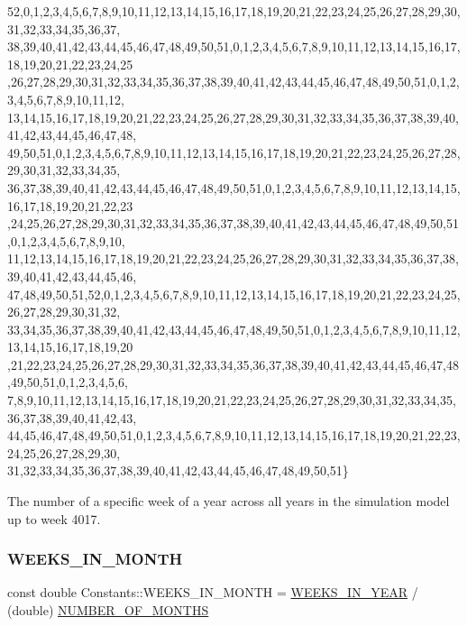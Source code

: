 \begin{DoxyCode}
      52,0,1,2,3,4,5,6,7,8,9,10,11,12,13,14,15,16,17,18,19,20,21,22,23,24,25,26,27,28,29,30,31,32,33,34,35,36,37,
      38,39,40,41,42,43,44,45,46,47,48,49,50,51,0,1,2,3,4,5,6,7,8,9,10,11,12,13,14,15,16,17,18,19,20,21,22,23,24,25
      ,26,27,28,29,30,31,32,33,34,35,36,37,38,39,40,41,42,43,44,45,46,47,48,49,50,51,0,1,2,3,4,5,6,7,8,9,10,11,12,
      13,14,15,16,17,18,19,20,21,22,23,24,25,26,27,28,29,30,31,32,33,34,35,36,37,38,39,40,41,42,43,44,45,46,47,48,
      49,50,51,0,1,2,3,4,5,6,7,8,9,10,11,12,13,14,15,16,17,18,19,20,21,22,23,24,25,26,27,28,29,30,31,32,33,34,35,
      36,37,38,39,40,41,42,43,44,45,46,47,48,49,50,51,0,1,2,3,4,5,6,7,8,9,10,11,12,13,14,15,16,17,18,19,20,21,22,23
      ,24,25,26,27,28,29,30,31,32,33,34,35,36,37,38,39,40,41,42,43,44,45,46,47,48,49,50,51,0,1,2,3,4,5,6,7,8,9,10,
      11,12,13,14,15,16,17,18,19,20,21,22,23,24,25,26,27,28,29,30,31,32,33,34,35,36,37,38,39,40,41,42,43,44,45,46,
      47,48,49,50,51,52,0,1,2,3,4,5,6,7,8,9,10,11,12,13,14,15,16,17,18,19,20,21,22,23,24,25,26,27,28,29,30,31,32,
      33,34,35,36,37,38,39,40,41,42,43,44,45,46,47,48,49,50,51,0,1,2,3,4,5,6,7,8,9,10,11,12,13,14,15,16,17,18,19,20
      ,21,22,23,24,25,26,27,28,29,30,31,32,33,34,35,36,37,38,39,40,41,42,43,44,45,46,47,48,49,50,51,0,1,2,3,4,5,6,
      7,8,9,10,11,12,13,14,15,16,17,18,19,20,21,22,23,24,25,26,27,28,29,30,31,32,33,34,35,36,37,38,39,40,41,42,43,
      44,45,46,47,48,49,50,51,0,1,2,3,4,5,6,7,8,9,10,11,12,13,14,15,16,17,18,19,20,21,22,23,24,25,26,27,28,29,30,
      31,32,33,34,35,36,37,38,39,40,41,42,43,44,45,46,47,48,49,50,51\}
\end{DoxyCode}


The number of a specific week of a year across all years in the simulation model up to week 4017. 

\mbox{\label{classConstants_a74ad24a642858cc193c678329422e5ad}} 
\subsubsection{\texorpdfstring{W\+E\+E\+K\+S\+\_\+\+I\+N\+\_\+\+M\+O\+N\+TH}{WEEKS\_IN\_MONTH}}
{\footnotesize\ttfamily const double Constants\+::\+W\+E\+E\+K\+S\+\_\+\+I\+N\+\_\+\+M\+O\+N\+TH = \mbox{\hyperlink{classConstants_a19e84af3cbc6e1318beb22408c2a1f2f}{W\+E\+E\+K\+S\+\_\+\+I\+N\+\_\+\+Y\+E\+AR}} / (double) \mbox{\hyperlink{classConstants_aced78823f6427b8251297408fa8e6555}{N\+U\+M\+B\+E\+R\+\_\+\+O\+F\+\_\+\+M\+O\+N\+T\+HS}}}



